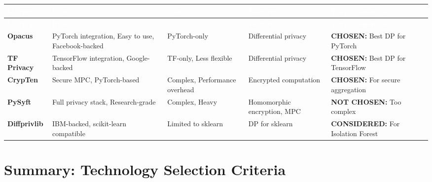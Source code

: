 \documentclass[12pt,a4paper,landscape]{article}
\begin{document}
\begin{longtable}{|p{2.5cm}|p{3cm}|p{3cm}|p{3cm}|p{4cm}|}
\hline
\rowcolor{headercolor}
\textcolor{white}{\textbf{Library}} & 
\textcolor{white}{\textbf{Pros}} & 
\textcolor{white}{\textbf{Cons}} & 
\textcolor{white}{\textbf{Features}} & 
\textcolor{white}{\textbf{Why Chosen/Not}} \\
\hline
\endfirsthead

\hline
\rowcolor{headercolor}
\textcolor{white}{\textbf{Library}} & 
\textcolor{white}{\textbf{Pros}} & 
\textcolor{white}{\textbf{Cons}} & 
\textcolor{white}{\textbf{Features}} & 
\textcolor{white}{\textbf{Why Chosen/Not}} \\
\hline
\endhead

\rowcolor{rowcolor1}
\textbf{Opacus} & 
PyTorch integration, Easy to use, Facebook-backed & 
PyTorch-only & 
Differential privacy & 
\textbf{CHOSEN:} Best DP for PyTorch \\
\hline

\rowcolor{rowcolor2}
\textbf{TF Privacy} & 
TensorFlow integration, Google-backed & 
TF-only, Less flexible & 
Differential privacy & 
\textbf{CHOSEN:} Best DP for TensorFlow \\
\hline

\rowcolor{rowcolor1}
\textbf{CrypTen} & 
Secure MPC, PyTorch-based & 
Complex, Performance overhead & 
Encrypted computation & 
\textbf{CHOSEN:} For secure aggregation \\
\hline

\rowcolor{rowcolor2}
\textbf{PySyft} & 
Full privacy stack, Research-grade & 
Complex, Heavy & 
Homomorphic encryption, MPC & 
\textbf{NOT CHOSEN:} Too complex \\
\hline

\rowcolor{rowcolor1}
\textbf{Diffprivlib} & 
IBM-backed, scikit-learn compatible & 
Limited to sklearn & 
DP for sklearn & 
\textbf{CONSIDERED:} For Isolation Forest \\
\hline
\end{longtable}

\section*{Summary: Technology Selection Criteria}
\end{document}
